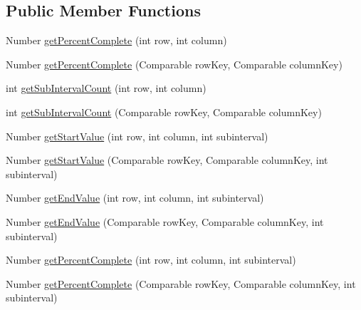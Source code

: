\subsection*{Public Member Functions}
\begin{DoxyCompactItemize}
\item 
Number \mbox{\hyperlink{interfaceorg_1_1jfree_1_1data_1_1gantt_1_1_gantt_category_dataset_a92688e6bd8e5eb38b2c78888c21c8a2f}{get\+Percent\+Complete}} (int row, int column)
\item 
Number \mbox{\hyperlink{interfaceorg_1_1jfree_1_1data_1_1gantt_1_1_gantt_category_dataset_aa5ddb721d32f80a587877db94589b9fd}{get\+Percent\+Complete}} (Comparable row\+Key, Comparable column\+Key)
\item 
int \mbox{\hyperlink{interfaceorg_1_1jfree_1_1data_1_1gantt_1_1_gantt_category_dataset_a290ee496bed2a6688f43e56c0824bb01}{get\+Sub\+Interval\+Count}} (int row, int column)
\item 
int \mbox{\hyperlink{interfaceorg_1_1jfree_1_1data_1_1gantt_1_1_gantt_category_dataset_af4749dc6ab0b5b67535b4ea0fa88f190}{get\+Sub\+Interval\+Count}} (Comparable row\+Key, Comparable column\+Key)
\item 
Number \mbox{\hyperlink{interfaceorg_1_1jfree_1_1data_1_1gantt_1_1_gantt_category_dataset_a83a54435ac557e310c8011d860b6d8ff}{get\+Start\+Value}} (int row, int column, int subinterval)
\item 
Number \mbox{\hyperlink{interfaceorg_1_1jfree_1_1data_1_1gantt_1_1_gantt_category_dataset_a3b0bc8be0c1344751017e9761acefa54}{get\+Start\+Value}} (Comparable row\+Key, Comparable column\+Key, int subinterval)
\item 
Number \mbox{\hyperlink{interfaceorg_1_1jfree_1_1data_1_1gantt_1_1_gantt_category_dataset_ad092e9e7050d018c0811261c745f0965}{get\+End\+Value}} (int row, int column, int subinterval)
\item 
Number \mbox{\hyperlink{interfaceorg_1_1jfree_1_1data_1_1gantt_1_1_gantt_category_dataset_a52fe0cb6c2e19b3154549807505899d5}{get\+End\+Value}} (Comparable row\+Key, Comparable column\+Key, int subinterval)
\item 
Number \mbox{\hyperlink{interfaceorg_1_1jfree_1_1data_1_1gantt_1_1_gantt_category_dataset_a6d168854abc408d941ea1db0c1ced287}{get\+Percent\+Complete}} (int row, int column, int subinterval)
\item 
Number \mbox{\hyperlink{interfaceorg_1_1jfree_1_1data_1_1gantt_1_1_gantt_category_dataset_a0a58c2187aec46dc95f312c38abbf812}{get\+Percent\+Complete}} (Comparable row\+Key, Comparable column\+Key, int subinterval)
\end{DoxyCompactItemize}


